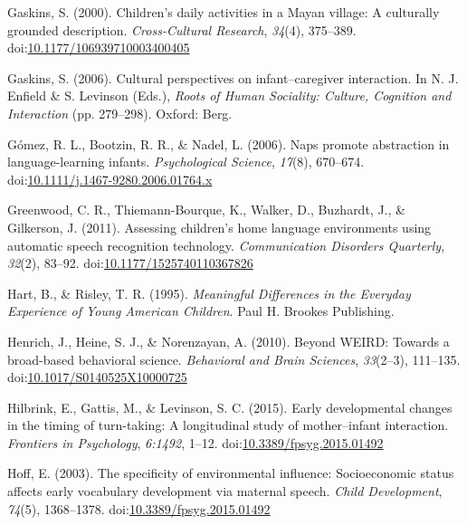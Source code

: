 \documentclass[floatsintext,man]{apa6}
\theoremstyle{definition}
\theoremstyle{definition}
\theoremstyle{definition}
\theoremstyle{remark}
\begin{document}
\hypertarget{ref-gaskins2000childrens}{}
Gaskins, S. (2000). Children's daily activities in a Mayan village: A
culturally grounded description. \emph{Cross-Cultural Research},
\emph{34}(4), 375--389.
doi:\href{https://doi.org/10.1177/106939710003400405}{10.1177/106939710003400405}

\hypertarget{ref-gaskins2006cultural}{}
Gaskins, S. (2006). Cultural perspectives on infant--caregiver
interaction. In N. J. Enfield \& S. Levinson (Eds.), \emph{Roots of
Human Sociality: Culture, Cognition and Interaction} (pp. 279--298).
Oxford: Berg.

\hypertarget{ref-gomez2006naps}{}
Gómez, R. L., Bootzin, R. R., \& Nadel, L. (2006). Naps promote
abstraction in language-learning infants. \emph{Psychological Science},
\emph{17}(8), 670--674.
doi:\href{https://doi.org/10.1111/j.1467-9280.2006.01764.x}{10.1111/j.1467-9280.2006.01764.x}

\hypertarget{ref-greenwood2011assessing}{}
Greenwood, C. R., Thiemann-Bourque, K., Walker, D., Buzhardt, J., \&
Gilkerson, J. (2011). Assessing children's home language environments
using automatic speech recognition technology. \emph{Communication
Disorders Quarterly}, \emph{32}(2), 83--92.
doi:\href{https://doi.org/10.1177/1525740110367826}{10.1177/1525740110367826}

\hypertarget{ref-hart1995meaningful}{}
Hart, B., \& Risley, T. R. (1995). \emph{Meaningful Differences in the
Everyday Experience of Young American Children}. Paul H. Brookes
Publishing.

\hypertarget{ref-henrich2010beyond}{}
Henrich, J., Heine, S. J., \& Norenzayan, A. (2010). Beyond WEIRD:
Towards a broad-based behavioral science. \emph{Behavioral and Brain
Sciences}, \emph{33}(2--3), 111--135.
doi:\href{https://doi.org/10.1017/S0140525X10000725}{10.1017/S0140525X10000725}

\hypertarget{ref-hilbrink2015early}{}
Hilbrink, E., Gattis, M., \& Levinson, S. C. (2015). Early developmental
changes in the timing of turn-taking: A longitudinal study of
mother--infant interaction. \emph{Frontiers in Psychology},
\emph{6:1492}, 1--12.
doi:\href{https://doi.org/10.3389/fpsyg.2015.01492}{10.3389/fpsyg.2015.01492}

\hypertarget{ref-hoff2003specificity}{}
Hoff, E. (2003). The specificity of environmental influence:
Socioeconomic status affects early vocabulary development via maternal
speech. \emph{Child Development}, \emph{74}(5), 1368--1378.
doi:\href{https://doi.org/10.3389/fpsyg.2015.01492}{10.3389/fpsyg.2015.01492}
\end{document}
